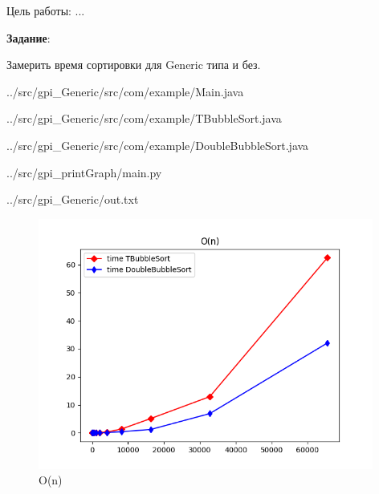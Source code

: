 Цель работы:
...

\textbf{Задание}:

Замерить время сортировки для Generic типа и без.


{../src/gpi_Generic/src/com/example/Main.java}


{../src/gpi_Generic/src/com/example/TBubbleSort.java}


{../src/gpi_Generic/src/com/example/DoubleBubbleSort.java}


{../src/gpi_printGraph/main.py}


{../src/gpi_Generic/out.txt}

\begin{figure}[!htp]
    \centering
    \includegraphics[width=11cm]
    {../src/gpi_printGraph/Figure.png}
    \caption{O(n)}
\end{figure}
